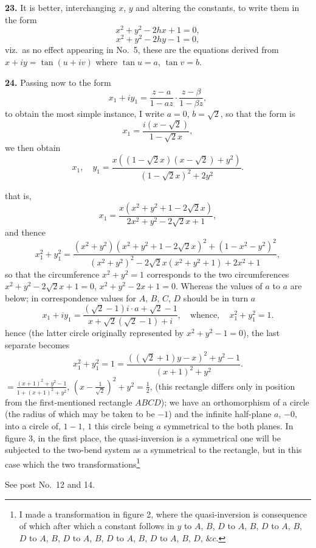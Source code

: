 \documentclass[11pt,a4paper]{book}
\begin{document}
\textbf{23.} It is better, interchanging $x$, $y$ and altering the constants, to write them in the form
\[
x^2 + y^2 - 2hx + 1 = 0,
\]
\[
x^2 + y^2 - 2hy - 1 = 0,
\]
viz.\ as no effect appearing in No.\ 5, these are the equations derived from $x + iy = \tan (u + iv)$ where $\tan u = a$, $\tan v = b$.

\textbf{24.} Passing now to the form
\[
x_1 + iy_1 = \frac{z - a}{1 - a z} \cdot \frac{z - \beta}{1 - \beta z},
\]
to obtain the most simple instance, I write $a = 0$, $b = \sqrt{2}$, so that the form is
\[
x_1 = \frac{i(x - \sqrt{2})}{1 - \sqrt{2}x},
\]
we then obtain
\[
x_1, \quad y_1 = \frac{x((1 - \sqrt{2}x)(x - \sqrt{2}) + y^2)}{(1 - \sqrt{2}x)^2 + 2y^2}.
\]

that is,
\[
x_1 = \frac{x(x^2 + y^2 + 1 - 2\sqrt{2}x)}{2x^2 + y^2 - 2\sqrt{2}x + 1},
\]
and thence
\[
x_1^2 + y_1^2 = \frac{(x^2 + y^2)(x^2 + y^2 + 1 - 2\sqrt{2}x)^2 + (1 - x^2 - y^2)^2}{(x^2 + y^2)^2 - 2\sqrt{2}x(x^2 + y^2 + 1) + 2x^2 + 1},
\]
so that the circumference $x^2 + y^2 = 1$ corresponds to the two circumferences $x^2 + y^2 - 2\sqrt{2}x + 1 = 0$, $x^2 + y^2 - 2x + 1 = 0$. Whereas the values of $a$ to $a$ are below; in correspondence values for $A$, $B$, $C$, $D$ should be in turn $a$
\[
x_1 + iy_1 = \frac{(\sqrt{2} - 1)i \cdot a + \sqrt{2} - 1}{x + \sqrt{2}(\sqrt{2} - 1) + i}, \quad \text{whence}, \quad x_1^2 + y_1^2 = 1.
\]
hence (the latter circle originally represented by $x^2 + y^2 - 1 = 0$), the last separate becomes
\[
x_1^2 + y_1^2 = 1 = \frac{((\sqrt{2} + 1)y - x)^2 + y^2 - 1}{(x + 1)^2 + y^2}.
\]
$= \frac{(x + 1)^2 + y^2 - 1}{1 + (x + 1)^2 + y^2}$, $(x - \frac{1}{\sqrt{2}})^2 + y^2 = \frac{1}{2}$,
(this rectangle differs only in position from the first-mentioned rectangle $ABCD$); we have an orthomorphism of a circle (the radius of which may be taken to be $-1$) and the infinite half-plane $a$, $-0$, into a circle of, $1 - 1$, $1$ this circle being $a$ symmetrical to the both planes. In figure 3, in the first place, the quasi-inversion is a symmetrical one will be subjected to the two-bend system as a symmetrical to the rectangle, but in this case which the two transformations\footnote{I made a transformation in figure 2, where the quasi-inversion is consequence of which after which a constant follows in $y$ to $A$, $B$, $D$ to $A$, $B$, $D$ to $A$, $B$, $D$ to $A$, $B$, $D$ to $A$, $B$, $D$ to $A$, $B$, $D$ to $A$, $B$, $D$, $\&c$.}

\hspace*{\fill} See post No.\ 12 and 14.
\end{document}
